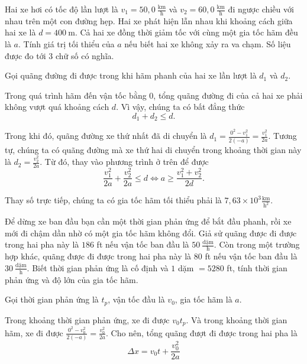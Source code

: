 \documentclass[a4paper, titlepage, openany]{book}
\newcounter{exercise}
\newcounter{solution}
\begin{document}
\exercise Hai xe hơi có tốc độ lần lượt là $v_1 = 50{,}0\ \frac{\text{km}}{\text{h}}$ và $v_2 = 60{,}0\ \frac{\text{km}}{\text{h}}$ đi ngược chiều với nhau trên một con đường hẹp. Hai xe phát hiện lẫn nhau khi khoảng cách giữa hai xe là $d = 400\ \text{m}$. Cả hai xe đồng thời giảm tốc với cùng một gia tốc hãm đều là $a$. Tính giá trị tối thiểu của $a$ nếu biết hai xe không xảy ra va chạm. Số liệu được đo tới $3$ chữ số có nghĩa.

\solution

Gọi quãng đường đi được trong khi hãm phanh của hai xe lần lượt là $d_1$ và $d_2$.

Trong quá trình hãm đến vận tốc bằng $0$, tổng quãng đường đi của cả hai xe phải không vượt quá khoảng cách $d$. Vì vậy, chúng ta có bất đẳng thức $$d_1 + d_2 \leq d.$$

Trong khi đó, quãng đường xe thứ nhất đã di chuyển là $d_1 = \frac{0^2 - v_1^2}{2(-a)} = \frac{v_1^2}{2a}$. Tương tự, chúng ta có quãng đường mà xe thứ hai di chuyển trong khoảng thời gian này là $d_2 = \frac{v_2^2}{2a}$. Từ đó, thay vào phương trình ở trên để được $$
   \frac{v_1^2}{2a} + \frac{v_2^2}{2a} \le d
   \iff a \geq \frac{v_1^2+v_2^2}{2d}.
$$

Thay số trực tiếp, chúng ta có gia tốc hãm tối thiểu phải là $\boxed{7{,}63 \times 10^3 \frac{\text{km}}{\text{h}^2}}$.

\exercise Để dừng xe ban đầu bạn cần một thời gian phản ứng để bắt đầu phanh, rồi xe mới đi chậm dần nhờ có một gia tốc hãm không đổi. Giả sử quãng được đi được trong hai pha này là $186$ ft nếu vận tốc ban đầu là $50\ \frac{\text{dặm}}{\text{h}}$. Còn trong một trường hợp khác, quãng được đi được trong hai pha này là $80$ ft nếu vận tốc ban đầu là $30\ \frac{\text{dặm}}{\text{h}}$. Biết thời gian phản ứng là cố định và $1$ dặm $= 5280$ ft, tính thời gian phản ứng và độ lớn của gia tốc hãm.

\solution

Gọi thời gian phản ứng là $t_p$, vận tốc đầu là $v_0$, gia tốc hãm là $a$.

Trong khoảng thời gian phản ứng, xe đi được $v_0t_p$. Và trong khoảng thời gian hãm, xe đi được $\frac{0^2-v_0^2}{2(-a)}=\frac{v_0^2}{2a}$. Cho nên, tổng quãng đượt đi được trong hai pha là 
\begin{equation}
\Delta x = v_0 t + \frac{v_0^2}{2a}
\label{eq:stopping_distance}
\end{equation}
\end{document}
